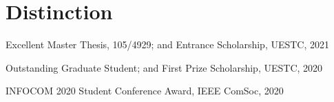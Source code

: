 \vspace{-8pt}
\section*{Distinction}
\vspace{-4pt}
\indent



Excellent Master Thesis, 105/4929; and Entrance Scholarship, UESTC, 2021

Outstanding Graduate Student; and First Prize Scholarship, UESTC, 2020

INFOCOM 2020 Student Conference Award, IEEE ComSoc, 2020
